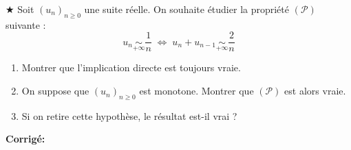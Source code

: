 \documentclass[a4paper,twoside,french,10pt]{VcCours}
\newcommand{\corr}{\textbf{Corrigé:}}
\begin{document}
\medskip


\begin{Exercice}{$\bigstar$} Soit $(u_n)_{n \geq 0}$ une suite réelle. On souhaite étudier la propriété $(\mathcal{P})$ suivante :
$$ u_n \underset{+ \infty}{\sim} \dfrac{1}{n} \; \Longleftrightarrow \; u_n + u_{n-1} \underset{+ \infty}{\sim} \dfrac{2}{n}$$
\begin{enumerate}
\item Montrer que l'implication directe est toujours vraie.
\item On suppose que $(u_n)_{n \geq 0}$ est monotone. Montrer que $(\mathcal{P})$ est alors vraie.
\item Si on retire cette hypothèse, le résultat est-il vrai ?
\end{enumerate}
\end{Exercice}

\corr
\end{document}
